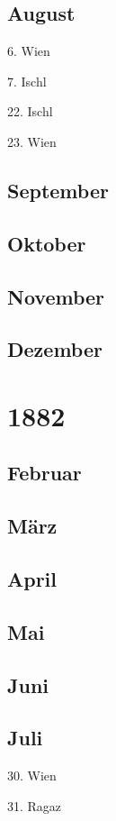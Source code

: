 \documentclass[twoside=false,titlepage=false,open=any, parskip=never, fontsize=10pt, headings=small, chapterprefix=false, appendixprefix=false, DIV=15]{scrbook}
\begin{document}
\begin{multicols}{3}
            \section*{August}
            6. Wien\par
            7. Ischl\par
            22. Ischl\par
            23. Wien\par
            \section*{September}
            \section*{Oktober}
            \section*{November}
            \section*{Dezember}
            \chapter*{1882}
            \section*{Februar}
            \section*{März}
            \section*{April}
            \section*{Mai}
            \section*{Juni}
            \section*{Juli}
            30. Wien\par
            31. Ragaz\par

\end{multicols}
\end{document}
